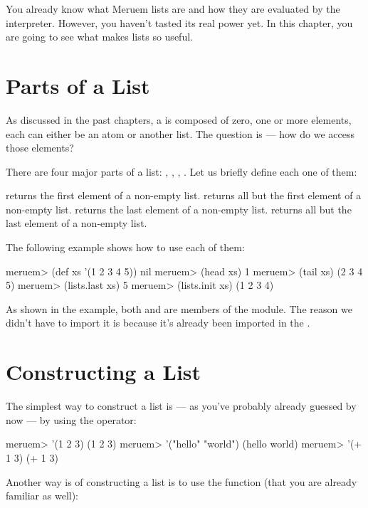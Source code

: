 You already know what Meruem lists are and how they are evaluated by the interpreter. However, you haven't tasted its real power yet. In this chapter, you are going to see what makes lists so useful. 

\section{Parts of a List}
As discussed in the past chapters, a  is composed of zero, one or more elements, each can either be an atom or another list. The question is --- how do we access those elements? 

There are four major parts of a list: , , , . Let us briefly define each one of them:

\begin{description}
	 returns the first element of a non-empty list.
	 returns all but the first element of a non-empty list.
	 returns the last element of a non-empty list.
	 returns all but the last element of a non-empty list.
\end{description}

The following example shows how to use each of them:

\begin{REPL}
meruem> (def xs '(1 2 3 4 5))
nil
meruem> (head xs)
1
meruem> (tail xs)
(2 3 4 5)
meruem> (lists.last xs)
5
meruem> (lists.init xs)
(1 2 3 4)
\end{REPL}

As shown in the example, both  and  are members of the  module. The reason we didn't have to import it is because it's already been imported in the .

\section{Constructing a List}
The simplest way to construct a list is --- as you've probably already guessed by now --- by using the  operator:

\begin{REPL}
meruem> '(1 2 3)
(1 2 3)
meruem> '("hello" "world")
(hello world)
meruem> '(+ 1 3)
(+ 1 3)
\end{REPL}

Another way is of constructing a list is to use the  function (that you are already familiar as well):

